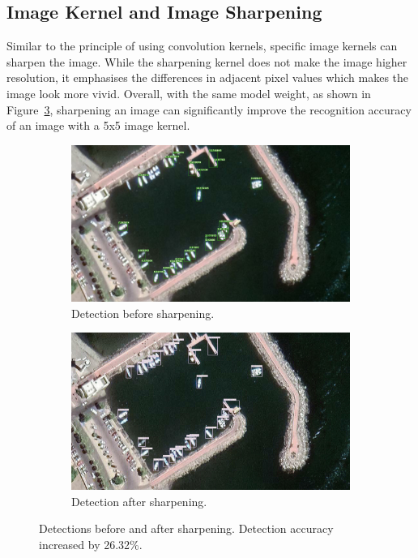 \newpage
\subsection{Image Kernel and Image Sharpening}
\label{sec3.2.2}
Similar to the principle of using convolution kernels, specific image kernels can sharpen the image. While the sharpening kernel does not make the image higher resolution, it emphasises the differences in adjacent pixel values which makes the image look more vivid. Overall, with the same model weight, as shown in Figure~\ref{fig:sharpening}, sharpening an image can significantly improve the recognition accuracy of an image with a 5x5 image kernel.

\begin{figure}[h!]
\centering
\begin{subfigure}[p]{0.7\textwidth}
    \centering
    \includegraphics[width=1\linewidth]{img/before_sharpening.jpg}
    \caption{Detection before sharpening.}
    \label{fig:before_sharpening}
\end{subfigure}

\begin{subfigure}[p]{0.7\textwidth}
    \centering
    \includegraphics[width=1\linewidth]{img/after_sharpening.jpg}
    \caption{Detection after sharpening.}
    \label{fig:after_sharpening}
\end{subfigure}
\caption{Detections before and after sharpening. Detection accuracy increased by 26.32\%.}
\label{fig:sharpening}
\end{figure}


